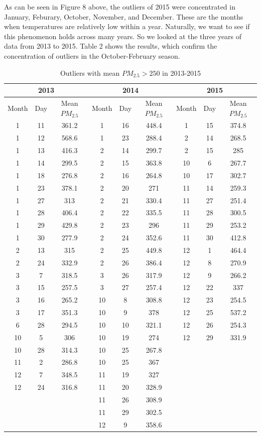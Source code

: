 \documentclass[11pt]{article} %
\begin{document}
As can be seen in Figure 8 above, the outliers of 2015 were concentrated in January, Feburary, October, November, and December. These are the months when temperatures are relatively low within a year. Naturally, we want to see if this phenomenon holds across many years. So we looked at the three years of data from 2013 to 2015. Table 2 shows the results, which confirm the concentration of outliers in the October-February season.

\begin{table}[t]
\begin{tabular}{| ccc | ccc | ccc |}
\hline
\multicolumn{3}{|c|}{2013} & 
\multicolumn{3}{|c|}{2014} &
\multicolumn{3}{|c|}{2015} \\ \hline
Month & Day & Mean \(PM_{2.5}\) & 
Month & Day & Mean \(PM_{2.5}\) &
Month & Day & Mean \(PM_{2.5}\) \\ \hline
1 & 11 & 361.2 &1 & 16 & 448.4 &1 & 15 & 374.8 \\
1 & 12 & 568.6 &1 & 23 & 288.4 &2 & 14 & 268.5  \\
1 & 13 & 416.3 &2 & 14 & 299.7 &2 & 15 & 285  \\
1 & 14 & 299.5 &2 & 15 & 363.8 &10 & 6 & 267.7 \\
1 & 18 & 276.8 &2 & 16 & 264.8 &10 & 17 & 302.7  \\
1 & 23 & 378.1 &2 & 20 & 271 &11 & 14 & 259.3  \\
1 & 27 & 313 &2 & 21 & 330.4 &11 & 27 & 251.4  \\
1 & 28 & 406.4 &2 & 22 & 335.5 &11 & 28 & 300.5  \\
1 & 29 & 429.8 &2 & 23 & 296 &11 & 29 & 253.2 \\
1 & 30 & 277.9 &2 & 24 & 352.6 &11 & 30 & 412.8  \\ 
2 & 13 & 315 &2 & 25 & 449.8 &12 & 1 & 464.4  \\
2 & 24 & 332.9 &2 & 26 & 386.4 &12 & 8 & 270.9   \\
3 & 7 & 318.5&3 & 26 & 317.9 &12 & 9 & 266.2  \\
3 & 15 & 257.5 &3 & 27 & 257.4 &12 & 22 & 337   \\
3 & 16 & 265.2 &10 & 8 & 308.8&12 & 23 & 254.5  \\
3 & 17 & 351.3 &10  & 9 & 378 &12 & 25 & 537.2   \\
6 & 28 & 294.5 &10 & 10 & 321.1 &12 & 26 & 254.3  \\
10 & 5 & 306 &10  & 19 & 274 &12 & 29 & 331.9  \\
10  & 28 & 314.3 &10 & 25 & 267.8 &&& \\
11 & 2 & 286.8 &10  & 25 & 367 &&& \\
12 & 7 & 348.5  &11 & 19 & 327 &&& \\
12 & 24 & 316.8 &11 & 20 & 328.9 &&& \\
&&&11 & 26 & 308.9 &&& \\
&&&11 & 29 & 302.5 &&& \\
&&&12 & 9 & 358.6 &&& \\
\hline
\end{tabular}
\caption{Outliers with mean \(PM_{2.5} > 250\) in 2013-2015}
\end{table}
\end{document}
